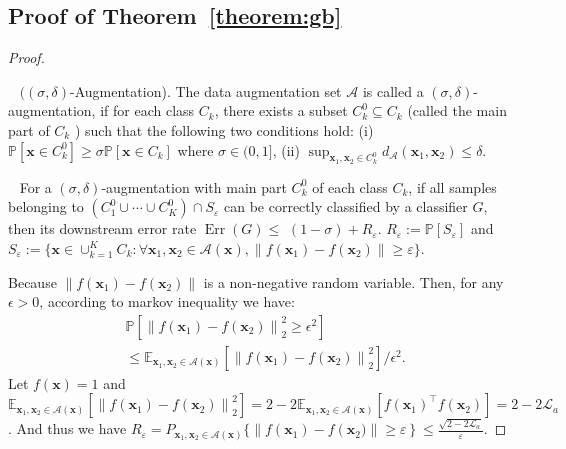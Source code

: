 \subsection{Proof of Theorem~\ref{theorem:gb}}
\label{gen_bound_proof}
\begin{proof}[Proof]
\begin{definition}~
 $((\sigma, \delta)$-Augmentation). The data augmentation set $\mathcal{A}$ is called a $(\sigma, \delta)$-augmentation, if for each class $C_{k}$, there exists a subset $C_{k}^{0} \subseteq C_{k}$ (called the main part of $C_{k}$ ) such that the following two conditions hold: (i) $\mathbb{P}\left[\mathbf{x} \in C_{k}^{0}\right] \geq \sigma \mathbb{P}\left[\mathbf{x} \in C_{k}\right]$ where $\sigma \in(0,1]$, (ii) $\sup _{\mathbf{x}_{1}, \mathbf{x}_{2} \in C_{k}^{0}} d_\mathcal{A}\left(\mathbf{x}_{1}, \mathbf{x}_{2}\right) \leq \delta$.
\end{definition}


\begin{lemma}~
For a $(\sigma, \delta)$-augmentation with main part $C_{k}^{0}$ of each class $C_{k}$, if all samples belonging to $\left(C_{1}^{0} \cup \cdots \cup C_{K}^{0}\right) \cap S_{\varepsilon}$ can be correctly classified by a classifier $G$, then its downstream error rate $\operatorname{Err}(G) \leq$ $(1-\sigma)+R_{\varepsilon}$. $R_{\varepsilon}:=\mathbb{P}\left[{S_{\varepsilon}}\right]$ and $S_{\varepsilon}:=\{\mathbf{x} \in \cup_{k=1}^{K} C_{k}: \forall \mathbf{x}_{1}, \mathbf{x}_{2} \in \mathcal{A}(\mathbf{x}),\left\|f\left(\mathbf{x}_{1}\right)-f\left(\mathbf{x}_{2}\right)\right\| \geq \varepsilon\}$.
\end{lemma}
Because $\left\|f\left(\mathbf{x}_{1}\right)-f\left(\mathbf{x}_{2}\right)\right\|$ is a non-negative random variable. Then, for any $\epsilon>0$, according to markov inequality we have:
\begin{equation}
\begin{aligned}
          &\mathbb{P}[\left\|f\left(\mathbf{x}_{1}\right)-f\left(\mathbf{x}_{2}\right)\right\|_2^2 \geq \epsilon^2 ]\\
          &\leq {\mathbb{E}_{\mathbf{x}_{1}, \mathbf{x}_{2} \in \mathcal{A}(\mathbf{x})}[\left\|f\left(\mathbf{x}_{1}\right)-f\left(\mathbf{x}_{2}\right)\right\|_2^2]}/{\epsilon^2}.
\end{aligned}
\end{equation}
Let $f(\mathbf{x})=1$ and  $\mathbb{E}_{\mathbf{x}_{1}, \mathbf{x}_{2} \in \mathcal{A}(\mathbf{x})}[\left\|f\left(\mathbf{x}_{1}\right)-f\left(\mathbf{x}_{2}\right)\right\|_2^2] = 2 - 2\mathbb{E}_{\mathbf{x}_{1}, \mathbf{x}_{2} \in \mathcal{A}(\mathbf{x})}[f\left(\mathbf{x}_{1}\right)^\top f\left(\mathbf{x}_{2}\right)]= 2-2\mathcal{L}_{a}$. And thus we have $R_{\varepsilon}\!\!= \!\!P_{\mathbf{x}_{1}, \mathbf{x}_{2} \in \mathcal{A}(\mathbf{x})}\{\|f\left(\mathbf{x}_{1}\right)\!-\!f\left(\mathbf{x}_{2})\| \!\geq\! \varepsilon\right\}\!\leq\!\frac{\sqrt{2-2\mathcal{L}_{a}}}{\varepsilon}$.
\end{proof}


